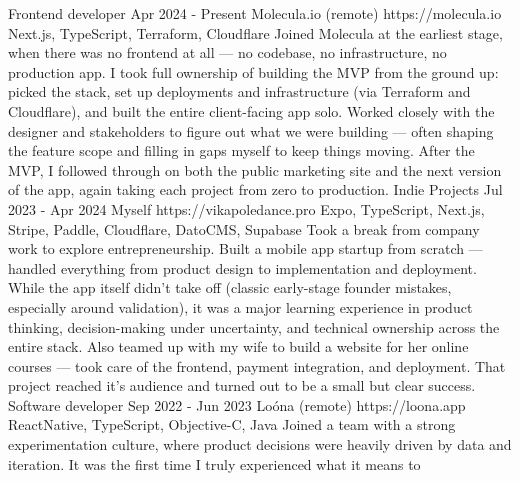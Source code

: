 \documentclass[11pt,a4paper,sans]{awesomecv}
\begin{document}
\begin{cventries}
  \cventry
    {Frontend developer}
    {Apr 2024 - Present}
    {Molecula.io (remote)}
    {https://molecula.io}
    {
      \cvproject
        {}{}{}
        {Next.js, TypeScript, Terraform, Cloudflare}
        {
          Joined Molecula at the earliest stage, when there was no frontend at all — no codebase, 
          no infrastructure, no production app. I took full ownership of building the MVP from the 
          ground up: picked the stack, set up deployments and infrastructure (via Terraform and Cloudflare), 
          and built the entire client-facing app solo.
          \hfill \break
          \hfill \break
          Worked closely with the designer and stakeholders to figure out what we were building — often shaping 
          the feature scope and filling in gaps myself to keep things moving.
          \hfill \break
          \hfill \break
          After the MVP, I followed through on both the public marketing site and 
          the next version of the app, again taking each project from zero to production.
          \hfill \break
          \hfill \break
        }
    }
\cventry
    {Indie Projects}
    {Jul 2023 - Apr 2024}
    {Myself}
    {https://vikapoledance.pro}
    {
      \cvproject
        {}{}{}
        {Expo, TypeScript, Next.js, Stripe, Paddle, Cloudflare, DatoCMS, Supabase}
        {
          Took a break from company work to explore entrepreneurship. 
          Built a mobile app startup from scratch — handled everything from product design 
          to implementation and deployment. 
          While the app itself didn't take off (classic early-stage founder mistakes, especially around validation), 
          it was a major learning experience in product thinking, decision-making under uncertainty, 
          and technical ownership across the entire stack.
          \hfill \break
          \hfill \break
          Also teamed up with my wife to build a website for her online courses — took care of the frontend, 
          payment integration, and deployment. That project reached it's audience and turned out to be a small but clear success.
          \hfill \break
        }
    }
\cventry
    {Software developer}
    {Sep 2022 - Jun 2023}
    {Loóna (remote)}
    {https://loona.app}
    {
      \cvproject
        {}{}{}
        {ReactNative, TypeScript, Objective-C, Java}
        {
          Joined a team with a strong experimentation culture, where product decisions were heavily 
          driven by data and iteration. It was the first time I truly experienced what it means to 
}}
\end{cventries}
\end{document}
